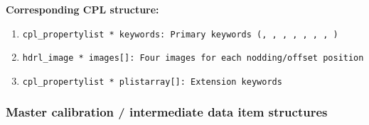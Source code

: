 \begin{datastructdef}
\textbf{Corresponding \ac{CPL} structure:}
\begin{enumerate}
    \item \texttt{cpl\_propertylist * keywords: Primary keywords (,  ,  ,  ,  ,  , , )}
    \item \texttt{hdrl\_image * images[]: Four images for each nodding/offset position}
    \item \texttt{cpl\_propertylist * plistarray[]: Extension keywords}
\end{enumerate}
\end{datastructdef}





\subsubsection{Master calibration / intermediate data item structures}\label{sssec:lmsprocdatastructs}


